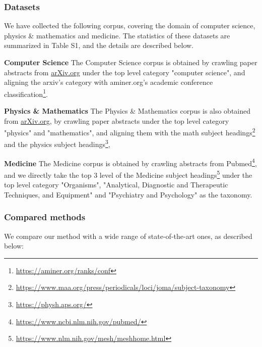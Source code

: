 \subsubsection{Datasets}
We have collected the following corpus, covering the domain of computer science, physics \& mathematics and medicine.
The statistics of these datasets are summarized in Table S1, and the details are described below.

\noindent \textbf{Computer Science} 
The Computer Science corpus is obtained by crawling paper abstracts from \url{arXiv.org} under the top level category "computer science", and aligning the arxiv's category with aminer.org's academic conference classification\footnote{\url{https://aminer.org/ranks/conf}}.

\noindent \textbf{Physics \& Mathematics} 
The Physics \& Mathematics corpus is also obtained from \url{arXiv.org}, 
by crawling paper abstracts under the top level category "physics" and "mathematics", and aligning them with the math subject headings\footnote{\url{https://www.maa.org/press/periodicals/loci/joma/subject-taxonomy}}
and the physics subject headings\footnote{\url{https://physh.aps.org/}},

\noindent \textbf{Medicine}
The Medicine corpus is obtained by crawling abstracts from Pubmed\footnote{\url{https://www.ncbi.nlm.nih.gov/pubmed/}}, and we directly take the top 3 level of 
the Medicine subject headings\footnote{\url{https://www.nlm.nih.gov/mesh/meshhome.html}} under the top level category "Organisms", "Analytical, Diagnostic and Therapeutic Techniques, and Equipment" and "Psychiatry and Psychology" as the taxonomy.



\subsubsection{Compared methods}
We compare our method with a wide range of state-of-the-art ones, as described below:

